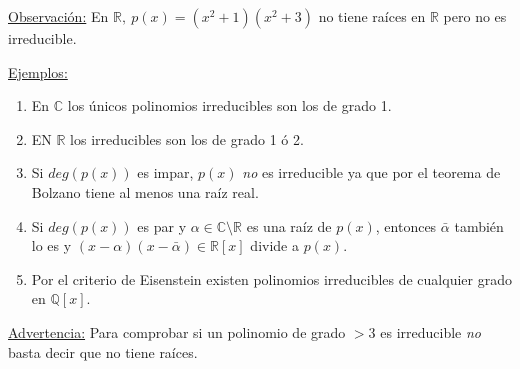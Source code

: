 \documentclass[10pt, a4paper]{article}
\newcommand{\R}{\mathbb{R}}
\newcommand{\C}{\mathbb{C}}
\newcommand{\Q}{\mathbb{Q}}
\newcommand{\obs}{\underline{Observación:} }
\newcommand{\ejs}{\underline{Ejemplos:} }
\newcommand{\adv}{{\color{red}\underline{Advertencia:} }}
\newenvironment{enumeratea}{\begin{enumerate}[label=\arabic*)]}
{\end{enumerate}}
\begin{document}
\obs En $\R,\ p(x) = (x^2 + 1)(x^2 + 3)$ no tiene raíces en $\R$ pero no es irreducible.

\vspace{3mm}

\ejs
\begin{enumeratea}
	\item En $\C$ los únicos polinomios irreducibles son los de grado 1.
	\item EN $\R$ los irreducibles son los de grado 1 ó 2.
	\item Si $deg(p(x))$ es impar, $p(x)$ \emph{no} es irreducible ya que por el teorema de Bolzano tiene al menos una raíz real.
	\item Si $deg(p(x))$ es par y $\alpha \in \C \setminus \R$ es una raíz de $p(x)$, entonces $\bar{\alpha}$ también lo es y $(x - \alpha)(x - \bar{\alpha}) \in \R[x]$ divide a $p(x)$.
	\item Por el criterio de Eisenstein existen polinomios irreducibles de cualquier grado en $\Q[x]$.
\end{enumeratea}

\vspace{3mm}

\adv Para comprobar si un polinomio de grado $> 3$ es irreducible \emph{no} basta decir que no tiene raíces.
\end{document}
